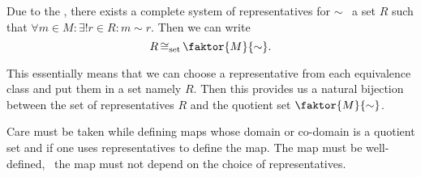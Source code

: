 \begin{remark}
	Due to the , there exists a complete system of representatives for \(\sim\) \ie\ a set \(R\) such that \(\forall m \in M: \exists! r \in R: m \sim r\). Then we can write
	\begin{equation}
		R \setIso \faktor{M}{\sim}.
	\end{equation}
\end{remark}
This essentially means that we can choose a representative from each equivalence class and put them in a set namely \(R\). Then this provides us a natural bijection between the set of representatives \(R\) and the quotient set \(\faktor{M}{\sim}\).

\begin{remark}
	Care must be taken while defining maps whose domain or co-domain is a quotient set and if one uses representatives to define the map. The map must be well-defined, \ie\ the map must not depend on the choice of representatives.
\end{remark}

